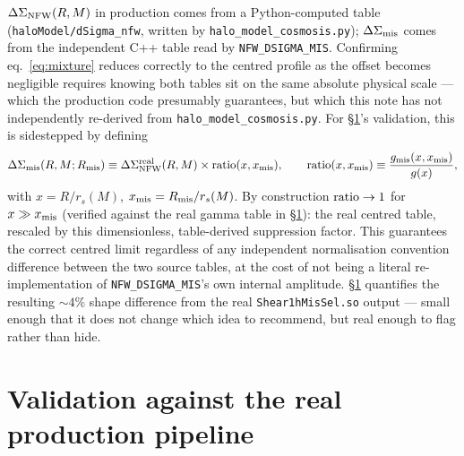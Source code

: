 \documentclass[a4paper, 11pt]{article}
\newcommand{\rs}{r_s}
\newcommand{\DSnfw}{\Delta\Sigma_{\rm NFW}}
\newcommand{\rmis}{R_{\rm mis}}
\begin{document}
$\DSnfw(R,M)$ in production comes from a Python-computed table
(\texttt{haloModel/dSigma\_nfw}, written by
\texttt{halo\_model\_cosmosis.py}); $\Delta\Sigma_{\rm mis}$ comes
from the independent C++ table read by \texttt{NFW\_DSIGMA\_MIS}.
Confirming eq.~\eqref{eq:mixture} reduces correctly to the centred
profile as the offset becomes negligible requires knowing both
tables sit on the same absolute physical scale --- which the
production code presumably guarantees, but which this note has not
independently re-derived from \texttt{halo\_model\_cosmosis.py}. For
\S\ref{sec:real_validation}'s validation, this is sidestepped by
defining
\begin{equation}
\Delta\Sigma_{\rm mis}(R,M;\rmis) \equiv \DSnfw^{\rm real}(R,M)\times
{\rm ratio}(x,x_{\rm mis}),
\qquad
{\rm ratio}(x,x_{\rm mis}) \equiv \frac{g_{\rm mis}(x,x_{\rm mis})}{g(x)},
\label{eq:mis_ratio_def}
\end{equation}
with $x=R/\rs(M)$, $x_{\rm mis}=\rmis/\rs(M)$. By construction
${\rm ratio}\to1$ for $x\gg x_{\rm mis}$ (verified against the real
gamma table in \S\ref{sec:real_validation}): the real centred table,
rescaled by this dimensionless, table-derived suppression factor.
This guarantees the correct
centred limit regardless of any independent normalisation
convention difference between the two source tables, at the cost of
not being a literal re-implementation of \texttt{NFW\_DSIGMA\_MIS}'s
own internal amplitude. \S\ref{sec:real_validation} quantifies the
resulting $\sim4\%$ shape difference from the real
\texttt{Shear1hMisSel.so} output --- small enough that it does not
change which idea to recommend, but real enough to flag rather than
hide.

\section{Validation against the real production pipeline}
\label{sec:real_validation}
\end{document}

